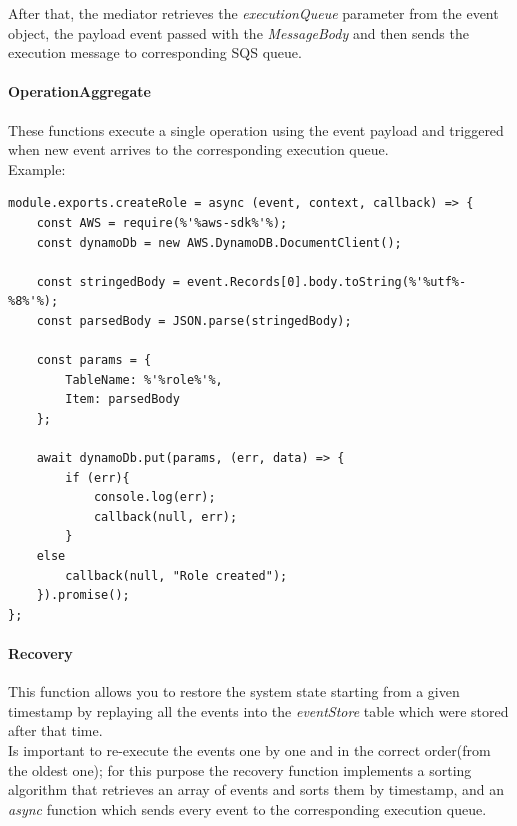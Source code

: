 After that, the mediator retrieves the \emph{executionQueue} parameter from the event object, the payload event passed with the \emph{MessageBody} and then sends the execution message to corresponding SQS queue. 

\paragraph{OperationAggregate} \Spazio
These functions execute a single operation using the event payload and triggered when new event arrives to the corresponding execution queue.\\
Example:
\begin{lstlisting}[escapechar=\%]
module.exports.createRole = async (event, context, callback) => {
	const AWS = require(%'%aws-sdk%'%);
	const dynamoDb = new AWS.DynamoDB.DocumentClient();
	
	const stringedBody = event.Records[0].body.toString(%'%utf%-%8%'%);
	const parsedBody = JSON.parse(stringedBody);
	
	const params = {
		TableName: %'%role%'%,
		Item: parsedBody
	};
	
	await dynamoDb.put(params, (err, data) => {
		if (err){
			console.log(err);
			callback(null, err);
		}
	else
		callback(null, "Role created");
	}).promise();
};
\end{lstlisting}

\paragraph{Recovery} \Spazio
This function allows you to restore the system state starting from a given timestamp by replaying all the events into the \emph{eventStore} table which were stored after that time. \\
Is important to re-execute the events one by one and in the correct order(from the oldest one); for this purpose the recovery function implements a sorting algorithm that retrieves an array of events and sorts them by timestamp, and an \emph{async} function which sends every event to the corresponding execution queue.

